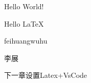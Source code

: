 \documentclass[UTF8]{ctexart}
\begin{document}
Hello World!
\par Hello \LaTeX
\par feihuangwuhu
\par 李展
\par 下一章设置Latex+VsCode
\end{document}

